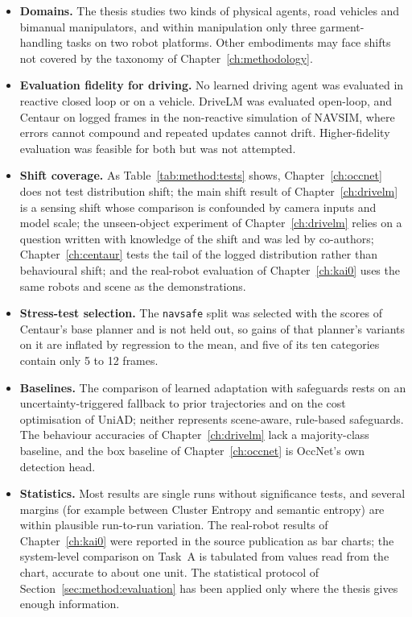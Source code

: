 \begin{itemize}[leftmargin=*, itemsep=3pt]
  \item \textbf{Domains.} The thesis studies two kinds of physical agents, road vehicles and bimanual manipulators, and within manipulation only three garment-handling tasks on two robot platforms. Other embodiments may face shifts not covered by the taxonomy of Chapter~\ref{ch:methodology}.
  \item \textbf{Evaluation fidelity for driving.} No learned driving agent was evaluated in reactive closed loop or on a vehicle. DriveLM was evaluated open-loop, and Centaur on logged frames in the non-reactive simulation of NAVSIM, where errors cannot compound and repeated updates cannot drift. Higher-fidelity evaluation was feasible for both but was not attempted.
  \item \textbf{Shift coverage.} As Table~\ref{tab:method:tests} shows, Chapter~\ref{ch:occnet} does not test distribution shift; the main shift result of Chapter~\ref{ch:drivelm} is a sensing shift whose comparison is confounded by camera inputs and model scale; the unseen-object experiment of Chapter~\ref{ch:drivelm} relies on a question written with knowledge of the shift and was led by co-authors; Chapter~\ref{ch:centaur} tests the tail of the logged distribution rather than behavioural shift; and the real-robot evaluation of Chapter~\ref{ch:kai0} uses the same robots and scene as the demonstrations.
  \item \textbf{Stress-test selection.} The \texttt{navsafe} split was selected with the scores of Centaur's base planner and is not held out, so gains of that planner's variants on it are inflated by regression to the mean, and five of its ten categories contain only 5 to 12 frames.
  \item \textbf{Baselines.} The comparison of learned adaptation with safeguards rests on an uncertainty-triggered fallback to prior trajectories and on the cost optimisation of UniAD; neither represents scene-aware, rule-based safeguards. The behaviour accuracies of Chapter~\ref{ch:drivelm} lack a majority-class baseline, and the box baseline of Chapter~\ref{ch:occnet} is OccNet's own detection head.
  \item \textbf{Statistics.} Most results are single runs without significance tests, and several margins (for example between Cluster Entropy and semantic entropy) are within plausible run-to-run variation. The real-robot results of Chapter~\ref{ch:kai0} were reported in the source publication as bar charts; the system-level comparison on Task~A is tabulated from values read from the chart, accurate to about one unit. The statistical protocol of Section~\ref{sec:method:evaluation} has been applied only where the thesis gives enough information.

\end{itemize}
